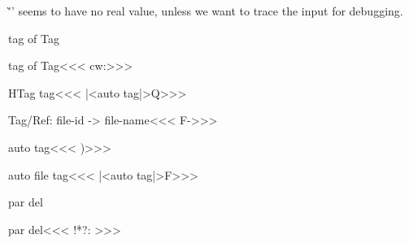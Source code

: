\`'\HComment' seems to have no real value, unless we want to
trace the input for debugging.



\FreeCode\<tag of Tag\>  %

\<tag of Tag\><<<
 cw:>>>

\<HTag tag\><<<
|<auto tag|>Q\aXrefFile >>>



\<Tag/Ref: file-id -> file-name\><<<
\empty F->>>

\<auto tag\><<<
)>>>

\<auto file tag\><<<
|<auto tag|>F\aXrefFile >>>


\FreeCode\<par del\>

\<par del\><<<
!*?: >>>
